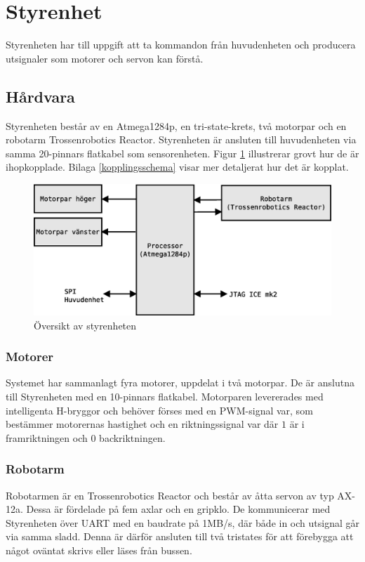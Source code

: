 
\section{Styrenhet}

Styrenheten har till uppgift att ta kommandon från huvudenheten och producera utsignaler som motorer och servon kan förstå.

\subsection{Hårdvara}
Styrenheten består av en Atmega1284p, en tri-state-krets\cite{tristate}, två motorpar och en robotarm Trossenrobotics Reactor\cite{robotarm}. Styrenheten är ansluten till huvudenheten via samma 20-pinnars flatkabel som sensorenheten. Figur \ref{styr-oversikt} illustrerar grovt hur de är ihopkopplade. Bilaga \ref{kopplingsschema} visar mer detaljerat hur det är kopplat.

\begin{figure}[h!]
	\centering
	\includegraphics[scale=0.4]{grafik/styrenhet-oversikt}
	\caption{Översikt av styrenheten} \label{styr-oversikt}
\end{figure}

\subsubsection{Motorer}
Systemet har sammanlagt fyra motorer, uppdelat i två motorpar. De är anslutna till Styrenheten med en 10-pinnars flatkabel. Motorparen levererades med intelligenta H-bryggor\cite{pwmmotor} och behöver förses med en PWM-signal var, som bestämmer motorernas hastighet och en riktningssignal var där $1$ är i framriktningen och $0$ backriktningen.

\subsubsection{Robotarm}
Robotarmen är en Trossenrobotics Reactor och består av åtta servon av typ AX-12a\cite{servo}. Dessa är fördelade på fem axlar och en gripklo. De kommunicerar med Styrenheten över UART med en baudrate på 1MB/s, där både in och utsignal går via samma sladd. Denna är därför ansluten till två tristates för att förebygga att något oväntat skrivs eller läses från bussen.

